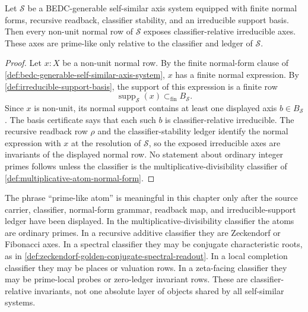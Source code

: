 \begin{theorem}
\label{thm:relative-priming-self-similar-normal-forms}
Let $\mathcal S$ be a BEDC-generable self-similar axis system equipped
with finite normal forms, recursive readback, classifier stability, and
an irreducible support basis. Then every non-unit normal row of
$\mathcal S$ exposes classifier-relative irreducible axes. These axes
are prime-like only relative to the classifier and ledger of
$\mathcal S$.
\end{theorem}

\begin{proof}
Let $x:X$ be a non-unit normal row. By the finite normal-form clause of
\autoref{def:bedc-generable-self-similar-axis-system}, $x$ has a finite
normal expression. By
\autoref{def:irreducible-support-basis}, the support of this expression
is a finite row
$$
\operatorname{supp}_{\mathcal S}(x)\subset_{\mathrm{fin}}B_{\mathcal S}.
$$
Since $x$ is non-unit, its normal support contains at least one displayed
axis $b\in B_{\mathcal S}$. The basis certificate says that each such
$b$ is classifier-relative irreducible. The recursive readback row
$\rho$ and the classifier-stability ledger identify the normal
expression with $x$ at the resolution of $\mathcal S$, so the exposed
irreducible axes are invariants of the displayed normal row. No
statement about ordinary integer primes follows unless the classifier is
the multiplicative-divisibility classifier of
\autoref{def:multiplicative-atom-normal-form}.
\end{proof}

\begin{principle}
\label{prin:self-similar-priming-relative}
The phrase ``prime-like atom'' is meaningful in this chapter only after
the source carrier, classifier, normal-form grammar, readback map, and
irreducible-support ledger have been displayed. In the
multiplicative-divisibility classifier the atoms are ordinary primes.
In a recursive additive classifier they are Zeckendorf or Fibonacci
axes. In a spectral classifier they may be conjugate characteristic
roots, as in
\autoref{def:zeckendorf-golden-conjugate-spectral-readout}. In a local
completion classifier they may be places or valuation rows. In a
zeta-facing classifier they may be prime-local probes or zero-ledger
invariant rows. These are classifier-relative invariants, not one
absolute layer of objects shared by all self-similar systems.
\end{principle}


